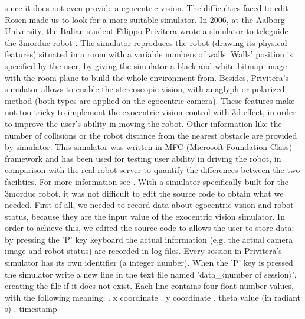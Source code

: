 since it does not even provide a egocentric vision. The difficulties faced to edit Rosen made us to look for a more suitable
simulator.
\newline In 2006, at the Aalborg University, the Italian student Filippo Privitera wrote a simulator to teleguide the
3morduc robot \cite{privitera}. The simulator reproduces the robot (drawing its physical features) situated in a room with a
variable numbers of walls. Walls' position is specified by the user, by giving the simulator a black and white bitmap image
with the room plane to build the whole environment from.
\newline Besides, Privitera's simulator allows to enable the stereoscopic vision, with anaglyph or polarized method (both 
types are applied on the egocentric camera). These features make not too tricky to implement the exocentric vision control with 3d
effect, in order to improve the user's ability in moving the robot. Other information like the number of collisions or the robot
distance from the nearest obstacle are provided by simulator.
\newline This simulator was written in MFC (Microsoft Foundation Class) framework and has been used for testing user ability in
driving the robot, in comparison with the real robot server to quantify the differences between the two facilities. For more
information see \cite{privitera}.
\newline With a simulator specifically built for the 3morduc robot, it was not difficult to edit the source code to obtain what we 
needed. First of all, we needed to record data about egocentric vision and robot status, because they are the input value 
of the exocentric vision simulator. In order to achieve this, we edited the source code to allows the user to store data: by
pressing the 'P' key keyboard the actual information (e.g. the actual camera image and robot status) are recorded in
log files.
\newline Every session in Privitera's simulator has its own identifier (a integer number). When the 'P' key is pressed the
simulator write a new line in the text file named 'data\_$\langle$number of session$\rangle$', creating the file if it does
not exist. Each line contains four float number values, with the following meaning:
\newline
{}. x coordinate
. y coordinate
. theta value (in radiant s)
. timestamp
